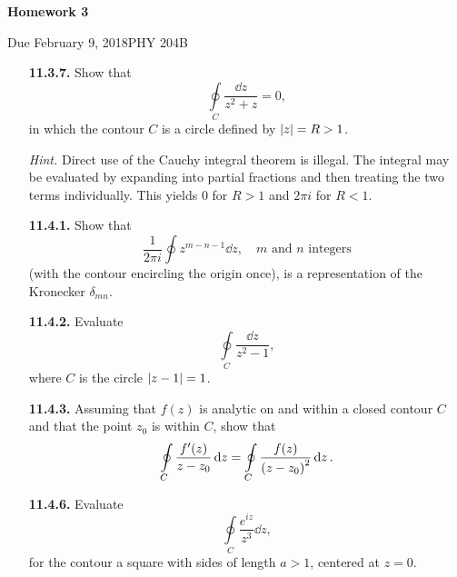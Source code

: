 \documentclass{article}
\newcommand{\Title}     {Homework 3}
\newcommand{\DueDate}   {February 9, 2018}
\newcommand{\Course}    {PHY 204B}
\begin{document}
{\huge\textbf{\Title}}

Due \DueDate \hfill \Course


\hrulefill
\begin{enumerate} %


\item [\textbf{11.3.7.}] Show that
\[
    \oint\limits_C \frac{\dd{z}}{z^2+z} = 0,
\]
in which the contour $C$ is a circle defined by $\abs{z} = R>1$.

\textit{Hint.} Direct use of the Cauchy integral theorem is illegal. The integral may be evaluated by expanding into partial fractions and then treating the two terms individually. This yields $0$ for $R>1$ and $2\pi i$ for $R<1$.



\item [\textbf{11.4.1.}] Show that
\[
    \frac{1}{2\pi i}\oint z^{m-n-1}\dd{z},\quad\text{$m$ and $n$ integers}
\]
(with the contour encircling the origin once), is a representation of the Kronecker $\delta_{mn}$.



\item [\textbf{11.4.2.}] Evaluate
\[
    \oint\limits_C \frac{\dd{z}}{z^2-1},
\]
where $C$ is the circle $\abs{z-1} = 1$.



\item [\textbf{11.4.3.}] Assuming that $f(z)$ is analytic on and within a closed contour $C$ and that the point $z_0$ is within $C$, show that
\[
    \oint\limits_C \frac{f'(z)}{z-z_0}\dd{z} = \oint\limits_C \frac{f(z)}{\pqty{z-z_0}^2}\dd{z}.
\]



\item [\textbf{11.4.6.}] Evaluate
\[
    \oint\limits_C \frac{e^{iz}}{z^3}\dd{z},
\]
for the contour a square with sides of length $a>1$, centered at $z=0$.


\end{enumerate}
\end{document}
